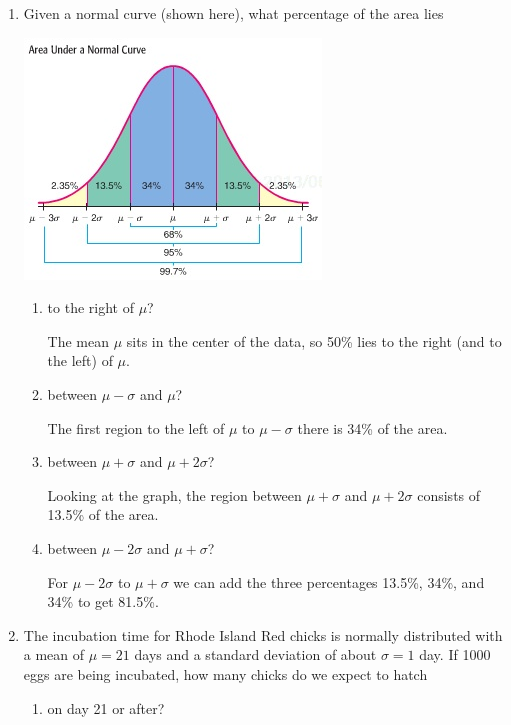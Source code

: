 \documentclass{article}
\newcommand{\answer}[1]{\color{red}#1}
\begin{document}
\pagestyle{myheadings}

\begin{enumerate}

\item Given a normal curve (shown here),  what percentage of the area lies 

\begin{center}
\includegraphics[scale=0.6]{WS10_NormalArea.jpg}
\end{center}

	\begin{enumerate}
	\item to the right of $\mu$? 
	
	{\answer The mean $\mu$ sits in the center of the data, so 50\% lies to the right (and to the left) of $\mu$.}
	
	\item between $\mu - \sigma$ and $\mu$? 
	
	{\answer The first region to the left of $\mu$ to $\mu-\sigma$ there is 34\% of the area.}
	
	\item between $\mu + \sigma$ and $\mu + 2\sigma$? 
	
	{\answer Looking at the graph, the region between $\mu + \sigma$ and $\mu +2\sigma$ consists of 13.5\% of the area.}
	
	\item between $\mu-2\sigma$ and $\mu + \sigma$? 
	
	{\answer For $\mu-2\sigma$ to $\mu + \sigma$ we can add the three percentages 13.5\%, 34\%, and 34\% to get 81.5\%.}
	
	\end{enumerate}
	
\item The incubation time for Rhode Island Red chicks is normally distributed with a mean of $\mu = 21$ days and a standard deviation of about $\sigma =1$ day.  If 1000 eggs are being incubated, how many chicks do we expect to hatch
	\begin{enumerate}
	\item on day 21 or after?
	

\end{enumerate}
\end{enumerate}
\end{document}
